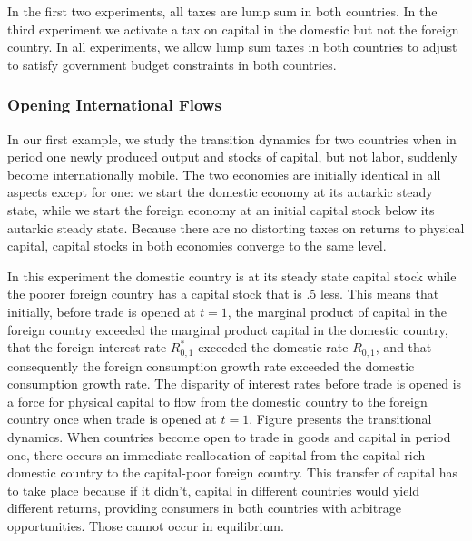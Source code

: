 \newpage

In the first two experiments, all taxes are lump sum in both countries.  In the third experiment we activate
a tax on capital in the domestic but not the foreign country.
In all experiments, we allow lump sum taxes in both countries  to adjust to satisfy government budget constraints in both countries.

\subsubsection{Opening International Flows}
In our
first example, we study the transition dynamics for two countries when  in period one
newly produced output and stocks of capital, but not labor,  suddenly  become internationally mobile. The two economies are initially
identical
in all  aspects except for one: we start the domestic
economy at its  autarkic steady state, while we start the  foreign economy
at an initial capital stock  below its autarkic steady state. Because  there are no
distorting  taxes on returns to physical capital, capital stocks in both economies   converge to the same level.

In this experiment the domestic country is at its steady state capital stock while the poorer foreign country
has a capital stock that is $.5$ less.  This means that initially, before trade is opened at $t=1$, the
marginal product of capital in the foreign country exceeded the marginal product capital in the domestic country, that the
foreign interest rate $R_{0,1}^*$ exceeded the domestic rate $R_{0,1}$, and that consequently the foreign consumption growth rate exceeded the
domestic consumption growth rate. The disparity of interest rates before trade is opened is a force for physical capital to flow from the domestic
country to the foreign country once when trade is opened at $t=1$.
Figure  presents the transitional dynamics. When countries
become open to trade in goods and capital in period one, there occurs an immediate reallocation of capital from the
capital-rich domestic country to the capital-poor foreign country. This transfer of capital has to take place because if it didn't,
  capital
in different countries  would yield different returns, providing consumers in both countries with arbitrage opportunities.
Those cannot occur in equilibrium. %

